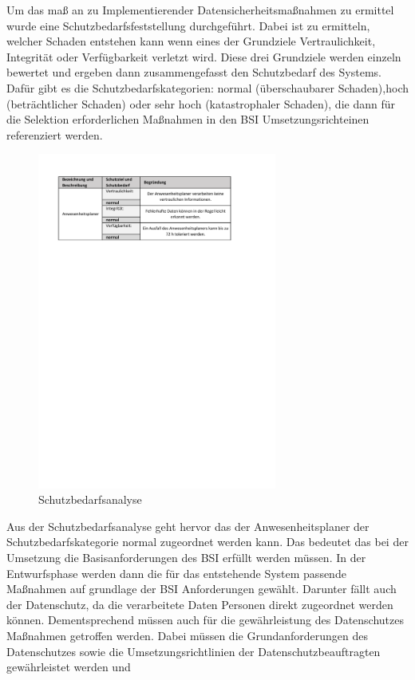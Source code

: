 Um das maß an zu Implementierender Datensicherheitsmaßnahmen zu ermittel wurde eine Schutzbedarfsfeststellung durchgeführt. Dabei ist zu ermitteln, welcher Schaden entstehen kann wenn eines der Grundziele Vertraulichkeit, Integrität oder Verfügbarkeit verletzt wird. Diese drei Grundziele werden einzeln bewertet und ergeben dann zusammengefasst den Schutzbedarf des Systems. Dafür gibt es die Schutzbedarfskategorien: normal (überschaubarer Schaden),hoch (beträchtlicher Schaden) oder sehr hoch (katastrophaler Schaden), die dann für die Selektion erforderlichen Maßnahmen in den BSI Umsetzungsrichteinen referenziert werden.

\begin{figure}[htbp]
    \centering
    \includegraphics[width=0.7\textwidth,angle=0]{abb/Schutzbedarfsanalyse.pdf}
    \caption[Beschreibung]{Schutzbedarfsanalyse}
    \label{abb:Schutzbedarfsanalyse}
\end{figure}

Aus der Schutzbedarfsanalyse geht hervor das der Anwesenheitsplaner der Schutzbedarfskategorie normal zugeordnet werden kann. Das bedeutet das bei der Umsetzung die Basisanforderungen des BSI erfüllt werden müssen. In der Entwurfsphase werden dann die für das entstehende System passende Maßnahmen auf grundlage der BSI Anforderungen gewählt. Darunter fällt auch der Datenschutz, da die verarbeitete Daten Personen direkt zugeordnet werden können. Dementsprechend müssen auch für die gewährleistung des Datenschutzes Maßnahmen getroffen werden. Dabei müssen die Grundanforderungen des Datenschutzes sowie die Umsetzungsrichtlinien der Datenschutzbeauftragten gewährleistet werden und 



